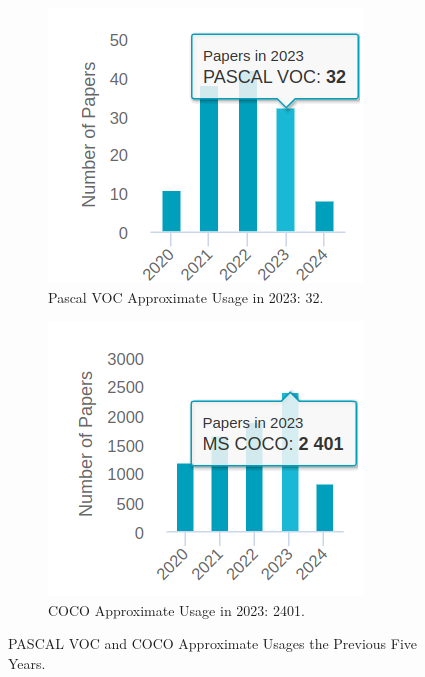 \begin{figure}[H]
    \centering
    \begin{subfigure}{0.40\textwidth}
        \centering
        \includegraphics[width=\textwidth]{Images/Dataset Usages/PASCAL.png}
        \caption{\centering Pascal VOC Approximate Usage in 2023: 32.}
    \end{subfigure}
    \begin{subfigure}{0.40\textwidth}
        \centering
        \includegraphics[width=\textwidth]{Images/Dataset Usages/COCO.png}
        \caption{\centering COCO Approximate Usage in 2023: 2401.}
    \end{subfigure}
    \caption[Datasets PASCAL VOC and COCO Approximate Usages]{\centering PASCAL VOC and COCO Approximate Usages the Previous Five Years.}
    \label{fig:coco_voc_usage}
\end{figure}

